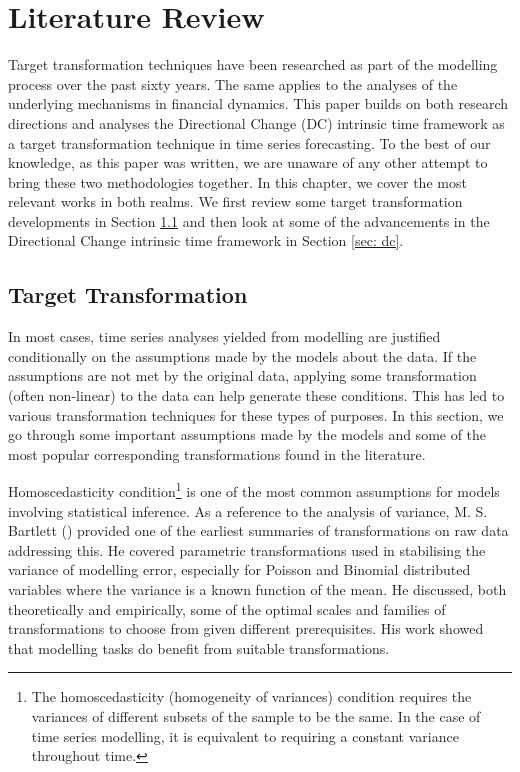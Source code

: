 \chapter{Literature Review}\label{ch: literature review}

Target transformation techniques have been researched as part of the modelling process over the past sixty years. The same applies to the analyses of the underlying mechanisms in financial dynamics. This paper builds on both research directions and analyses the Directional Change (DC) intrinsic time framework as a target transformation technique in time series forecasting. To the best of our knowledge, as this paper was written, we are unaware of any other attempt to bring these two methodologies together. In this chapter, we cover the most relevant works in both realms. We first review some target transformation developments in Section \ref{sec: target transformation} and then look at some of the advancements in the Directional Change intrinsic time framework in Section \ref{sec: dc}.

\section{Target Transformation}\label{sec: target transformation}

In most cases, time series analyses yielded from modelling are justified conditionally on the assumptions made by the models about the data. If the assumptions are not met by the original data, applying some transformation (often non-linear) to the data can help generate these conditions. This has led to various transformation techniques for these types of purposes. In this section, we go through some important assumptions made by the models and some of the most popular corresponding transformations found in the literature.

Homoscedasticity condition\footnote{The homoscedasticity (homogeneity of variances) condition requires the variances of different subsets of the sample to be the same. In the case of time series modelling, it is equivalent to requiring a constant variance throughout time.} is one of the most common assumptions for models involving statistical inference. As a reference to the analysis of variance, M. S. Bartlett (\citeyear{10.2307/3001536}) provided one of the earliest summaries of transformations on raw data addressing this. He covered parametric transformations used in stabilising the variance of modelling error, especially for Poisson and Binomial distributed variables where the variance is a known function of the mean. He discussed, both theoretically and empirically, some of the optimal scales and families of transformations to choose from given different prerequisites. His work showed that modelling tasks do benefit from suitable transformations.

